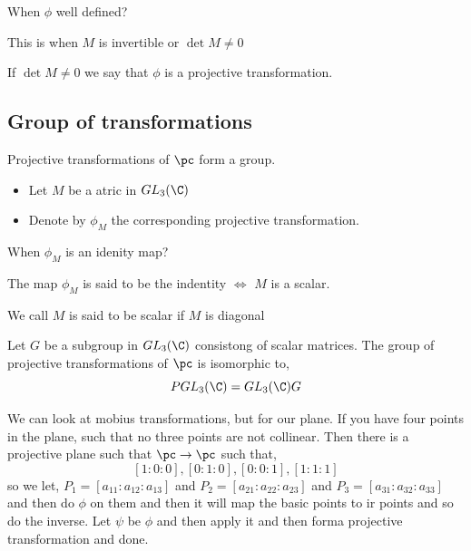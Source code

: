 \documentclass{article}
\begin{document}
\begin{question}
  When $\phi$ well defined?
\end{question}
This is when $M$ is invertible or $\det M \ne 0$

\begin{ndefi}
  If $\det M \ne 0$ we say that $\phi$ is a projective transformation.
\end{ndefi}

\subsection{Group of transformations}

Projective transformations of $\pc$ form a group.
\begin{itemize}
  \item Let $M$ be a atric in $GL_3(\C)$
  \item Denote by $\phi_M$ the corresponding projective transformation.
\end{itemize}

\begin{question}
  When $\phi_M$ is an idenity map?
\end{question}

The map $\phi_M$ is said to be the indentity $\iff$ $M$ is a scalar.

\begin{ndefi}[]
  We call $M$ is said to be scalar if $M$ is diagonal
\end{ndefi}

\begin{ncor}
   Let $G$  be a subgroup in $GL_3(\C)$ consistong of scalar matrices. The group of projective transformations of $\pc$ is isomorphic to,
   $$ PGL_3(\C) = GL_3(\C)\/G $$
\end{ncor}

We can look at mobius transformations, but for our plane. If you have four points in the plane, such that no three points are not collinear. Then there is a projective plane such that $\pc \to \pc$ such that,
$$ [1:0:0], [0:1:0], [0:0:1], [1:1:1] $$
so we let, $P_1 = [a_{11} : a_{12} : a_{13}]$ and $P_2 = [a_{21} : a_{22} : a_{23}]$ and $P_3 = [a_{31} : a_{32} : a_{33}]$ and then do $\phi$ on them and then it will map the basic points to ir points and so do the inverse. Let $\psi$ be $\phi$ and then apply it and then forma projective transformation and done.
\end{document}
